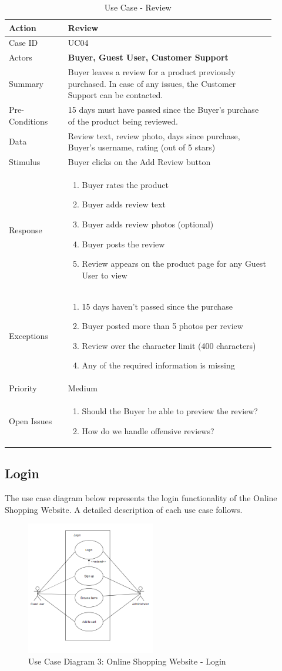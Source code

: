 \documentclass[11pt]{article}
\newcounter{use case ID}
\newcommand\tabularhead[1]{
    \begin{table}[ht]
        \addtocounter{use case ID}{1}
        \caption{Use Case \arabic{use case ID} - #1}
        \vspace{0.2cm}
        \begin{tabular}{|p{0.2\linewidth}|p{0.70\linewidth}|}
            \hline
            \textbf{Action} & \textbf{#1} \\
            \hline}
\newcommand\addrow[2]{#1 & #2\\ \hline}
\newcommand\addmulrow[2]{ \begin{minipage}[t][][t]{2.5cm}#1\end{minipage}
                &\begin{minipage}[t][][t]{11cm}
                    \begin{enumerate}[itemsep=-1ex] #2   \end{enumerate}
                \end{minipage}\vfill\\ \hline}
\newenvironment{usecase}{\tabularhead}
        {\hline\end{tabular}\end{table}}
\newcounter{req ID}
\begin{document}
\begin{usecase}{Review}
    \addrow{Case ID}{UC04}
    \addrow{Actors}{\textbf{Buyer, Guest User, Customer Support}}
    \addrow{Summary}{Buyer leaves a review for a product previously purchased. In case of any issues, the Customer Support can be contacted.}
    \addrow{Pre-Conditions}{
        15 days must have passed since the Buyer’s purchase of the product being reviewed.
        }
    \addrow{Data}{
Review text, review photo, days since purchase, Buyer’s username, rating (out of 5 stars)
}
    \addrow{Stimulus}{Buyer clicks on the Add Review button}
    \addmulrow{Response}{
        \item Buyer rates the product
        \item Buyer adds review text
        \item Buyer adds review photos (optional)
        \item Buyer posts the review
        \item Review appears on the product page for any Guest User to view
    }
    \addmulrow{Exceptions}{
        \item 15 days haven’t passed since the purchase
        \item Buyer posted more than 5 photos per review
        \item Review over the character limit (400 characters)
        \item Any of the required information is missing
    }
    \addrow{Priority}{Medium}
    \addmulrow{Open Issues}{
        \item Should the Buyer be able to preview the review?
        \item How do we handle offensive reviews?
    }
\end{usecase}


\clearpage
\subsection{Login}

The use case diagram below represents the login functionality of the Online Shopping Website. A detailed description of each use case follows. 

\begin{figure}[htbp]
    \centering
    \includegraphics[width=0.5\textwidth]{ucd3.png}
    \caption{Use Case Diagram 3: Online Shopping Website - Login }
    \label{fig:ucd2}
\end{figure}
\end{document}
